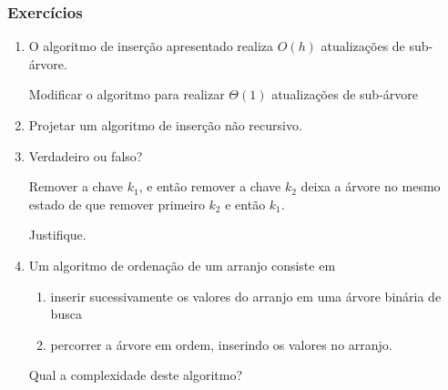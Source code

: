 \documentclass{beamer}
\begin{document}
\begin{frame}

\frametitle{Exercícios}

\begin{enumerate}

  \item O algoritmo de inserção apresentado realiza $O(h)$
    atualizações de sub-árvore.

    Modificar o algoritmo para realizar $\Theta(1)$ atualizações
    de sub-árvore

  \item Projetar um algoritmo de inserção não recursivo.

  \item Verdadeiro ou falso?

    Remover a chave $k_1$, e então remover a chave $k_2$ deixa a árvore no
    mesmo estado de que remover primeiro $k_2$ e então $k_1$.

    Justifique.

  \item Um algoritmo de ordenação de um arranjo consiste em 
    \begin{enumerate}
      \item inserir sucessivamente os valores do arranjo em uma árvore binária de busca
      \item percorrer a árvore em ordem, inserindo os valores no arranjo.

    \end{enumerate}

    Qual a complexidade deste algoritmo?

\end{enumerate}

\end{frame}
\end{document}
